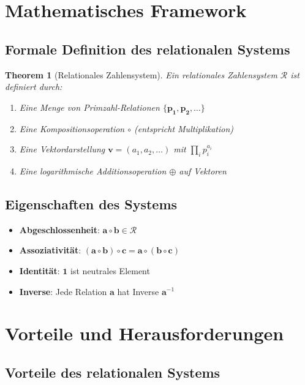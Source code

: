 \documentclass[11pt,a4paper]{article}
\newcommand{\primrel}[1]{\mathbf{#1}}
\newcommand{\vect}[1]{\boldsymbol{#1}}
\newtheorem{theorem}{Theorem}[section]
\begin{document}
	\section{Mathematisches Framework}
	
	\subsection{Formale Definition des relationalen Systems}
	
	\begin{theorem}[Relationales Zahlensystem]
		Ein relationales Zahlensystem $\mathcal{R}$ ist definiert durch:
		\begin{enumerate}
			\item Eine Menge von Primzahl-Relationen $\{\primrel{p_1}, \primrel{p_2}, \ldots\}$
			\item Eine Kompositionsoperation $\circ$ (entspricht Multiplikation)
			\item Eine Vektordarstellung $\vect{v} = (a_1, a_2, \ldots)$ mit $\prod_i p_i^{a_i}$
			\item Eine logarithmische Additionsoperation $\oplus$ auf Vektoren
		\end{enumerate}
	\end{theorem}
	
	\subsection{Eigenschaften des Systems}
	
	\begin{itemize}
		\item \textbf{Abgeschlossenheit}: $\primrel{a} \circ \primrel{b} \in \mathcal{R}$
		\item \textbf{Assoziativität}: $(\primrel{a} \circ \primrel{b}) \circ \primrel{c} = \primrel{a} \circ (\primrel{b} \circ \primrel{c})$
		\item \textbf{Identität}: $\primrel{1}$ ist neutrales Element
		\item \textbf{Inverse}: Jede Relation $\primrel{a}$ hat Inverse $\primrel{a}^{-1}$
	\end{itemize}
	
	\section{Vorteile und Herausforderungen}
	
	\subsection{Vorteile des relationalen Systems}
	
\end{document}

